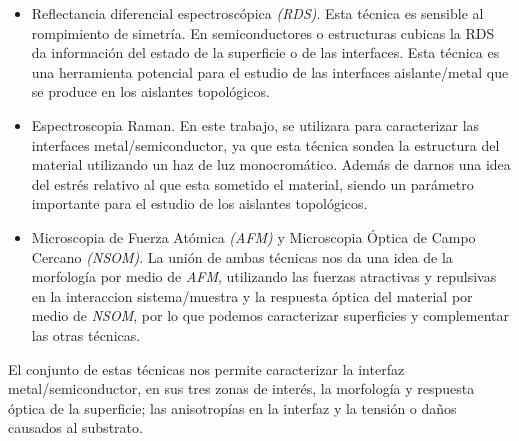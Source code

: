 \begin{itemize}
    \item Reflectancia diferencial espectroscópica \textit{(RDS)}. Esta técnica es sensible al rompimiento 
    de simetría. En semiconductores o estructuras cubicas la RDS da información del estado de la superficie o de las interfaces. Esta técnica es una herramienta potencial para el estudio de las interfaces aislante/metal que se produce en los aislantes topológicos.

    \item Espectroscopia Raman. En este trabajo, se utilizara para caracterizar las interfaces 
    metal/semiconductor, ya que esta técnica sondea la estructura del material utilizando un haz de luz 
    monocromático. Además de darnos una idea del estrés relativo al que esta sometido el material, siendo 
    un parámetro importante para el estudio de los aislantes topológicos.

    \item Microscopia de Fuerza Atómica \textit{(AFM)} y Microscopia Óptica de Campo Cercano 
    \textit{(NSOM)}. La unión de ambas técnicas nos da una idea de la morfología por medio de \textit{AFM}, utilizando las fuerzas atractivas y repulsivas en la interaccion sistema/muestra y la respuesta óptica del material por medio de \textit{NSOM}, por lo que podemos caracterizar superficies y complementar las otras técnicas.
\end{itemize}

El conjunto de estas técnicas nos permite caracterizar la interfaz metal/semiconductor, en sus tres zonas de interés, la morfología y respuesta óptica de la superficie; las anisotropías en la interfaz y la tensión o daños causados al substrato.